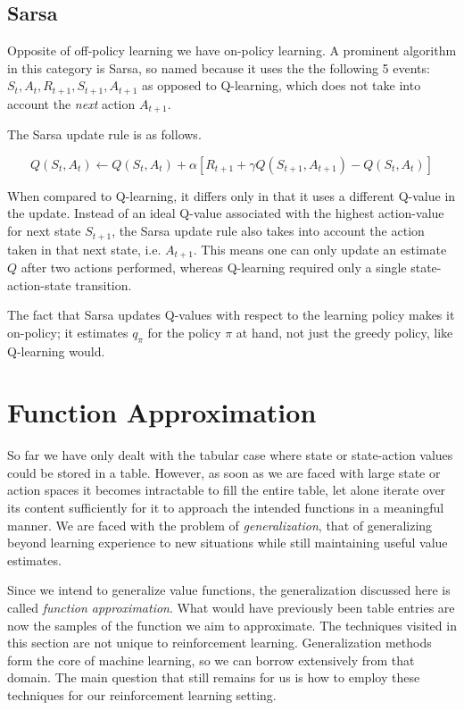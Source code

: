 \subsection{Sarsa}
\label{sub:sarsa}
Opposite of off-policy learning we have on-policy learning.
A prominent algorithm in this category is Sarsa,
so named because it uses the the following 5 events:
$S_t, A_t, R_{t+1}, S_{t+1}, A_{t+1}$
as opposed to Q-learning, which does not take into account
the \textit{next} action $A_{t+1}$.

The Sarsa update rule is as follows.

\begin{equation}
  \label{eq:sarsa}
  Q(S_t, A_t) \leftarrow Q(S_t, A_t) + \alpha \left[ R_{t+1} + \gamma Q(S_{t+1}, A_{t+1}) - Q(S_t, A_t) \right]
\end{equation}

When compared to Q-learning,
it differs only in that it uses a different Q-value in the update.
Instead of an ideal Q-value associated with the highest action-value
for next state $S_{t+1}$,
the Sarsa update rule also takes into account
the action taken in that next state, i.e. $A_{t+1}$.
This means one can only update an estimate $Q$
after two actions performed,
whereas Q-learning required only a single state-action-state transition.

The fact that Sarsa updates Q-values
with respect to the learning policy makes it on-policy;
it estimates $q_\pi$ for the policy $\pi$ at hand,
not just the greedy policy,
like Q-learning would.


\section{Function Approximation}
\label{sec:function_approximation}
So far we have only dealt with the tabular case
where state or state-action values could be stored in a table.
However, as soon as we are faced with large state or action spaces
it becomes intractable to fill the entire table,
let alone iterate over its content sufficiently
for it to approach the intended functions in a meaningful manner.
We are faced with the problem of \textit{generalization},
that of generalizing beyond learning experience to new situations
while still maintaining useful value estimates.

Since we intend to generalize value functions,
the generalization discussed here is called \textit{function approximation}.
What would have previously been table entries
are now the samples of the function we aim to approximate.
The techniques visited in this section are not unique to reinforcement learning.
Generalization methods form the core of machine learning,
so we can borrow extensively from that domain.
The main question that still remains for us is how to employ
these techniques for our reinforcement learning setting.

